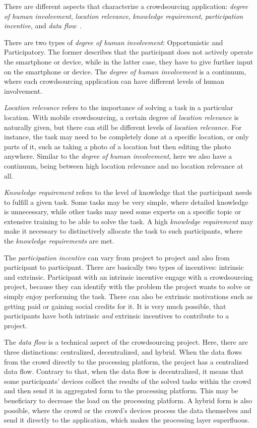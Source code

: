 There are different aspects that characterize a crowdsourcing application: \textit{degree of human involvement}, \textit{location relevance}, \textit{knowledge requirement}, \textit{participation incentive}, and \textit{data flow}~\cite{ray2023survey,kong2019mobile}.

There are two types of \textit{degree of human involvement}: Opportunistic and Participatory.
The former describes that the participant does not actively operate the smartphone or device, while in the latter case, they have to give further input on the smartphone or device.
The \textit{degree of human involvement} is a continuum, where each crowdsourcing application can have different levels of human involvement.

\textit{Location relevance} refers to the importance of solving a task in a particular location.
With mobile crowdsourcing, a certain degree of \textit{location relevance} is naturally given, but there can still be different levels of \textit{location relevance}.
For instance, the task may need to be completely done at a specific location, or only parts of it, such as taking a photo of a location but then editing the photo anywhere.
Similar to the \textit{degree of human involvement}, here we also have a continuum, being between high location relevance and no location relevance at all.

\textit{Knowledge requirement} refers to the level of knowledge that the participant needs to fulfill a given task.
Some tasks may be very simple, where detailed knowledge is unnecessary, while other tasks may need some experts on a specific topic or extensive training to be able to solve the task.
A high \textit{knowledge requirement} may make it necessary to distinctively allocate the task to such participants, where the \textit{knowledge requirements} are met.

The \textit{participation incentive} can vary from project to project and also from participant to participant.
There are basically two types of incentives: intrinsic and extrinsic.
Participant with an intrinsic incentive engage with a crowdsourcing project, because they can identify with the problem the project wants to solve or simply enjoy performing the task.
There can also be extrinsic motivations such as getting paid or gaining social credits for it.
It is very much possible, that participants have both intrinsic \textit{and} extrinsic incentives to contribute to a project.

The \textit{data flow} is a technical aspect of the crowdsourcing project.
Here, there are three distinctions: centralized, decentralized, and hybrid.
When the data flows from the crowd directly to the processing platform, the project has a centralized data flow.
Contrary to that, when the data flow is decentralized, it means that some participants' devices collect the results of the solved tasks within the crowd and then send it in aggregated form to the processing platform.
This may be beneficiary to decrease the load on the processing platform.
A hybrid form is also possible, where the crowd or the crowd's devices process the data themselves and send it directly to the application, which makes the processing layer superfluous. 

